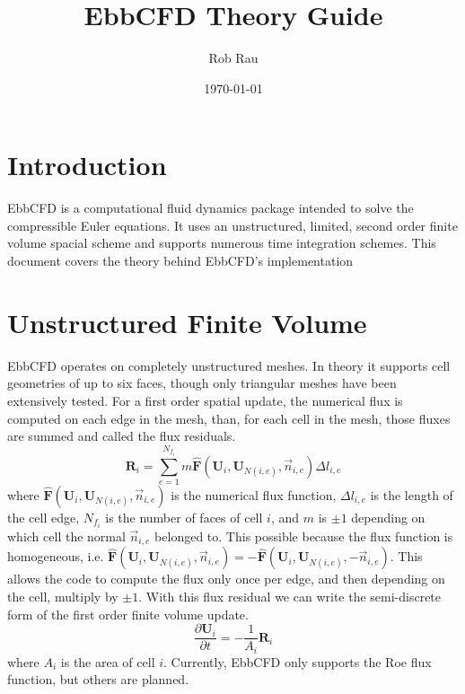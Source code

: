\documentclass[12pt,parskip=full]{article}
\numberwithin{subsection}{section}
\begin{document}
	\vspace{-4ex}
	\title{EbbCFD Theory Guide\vspace{-3.5ex}}
	\author{Rob Rau\vspace{-4ex}}
	\date{\today\vspace{-4ex}}
	\maketitle

	\section{Introduction}
		EbbCFD is a computational fluid dynamics package intended to solve the compressible Euler equations.
		It uses an unstructured, limited, second order finite volume spacial scheme and supports numerous
		time integration schemes. This document covers the theory behind EbbCFD's implementation

	\section{Unstructured Finite Volume}
		EbbCFD operates on completely unstructured meshes. In theory it supports cell geometries of up to six faces,
		though only triangular meshes have been extensively tested. For a first order spatial update, the numerical flux
		is computed on each edge in the mesh, than, for each cell in the mesh, those fluxes are summed and called the
		flux residuals.
		\begin{equation}
			\mathbf{R}_i = \sum_{e = 1}^{N_{f_i}}{m\mathbf{\hat{F}}(\mathbf{U}_i, \mathbf{U}_{N(i,e)}, \vec{n}_{i,e}) \Delta l_{i,e}}
		\end{equation}
		where $\mathbf{\hat{F}}(\mathbf{U}_i, \mathbf{U}_{N(i,e)}, \vec{n}_{i,e})$ is the numerical flux function,
		$\Delta l_{i,e}$ is the length of the cell edge, $N_{f_i}$ is the number of faces of cell $i$, and $m$ is $\pm 1$
		depending on which cell the normal $\vec{n}_{i,e}$ belonged to. This possible because the flux function is homogeneous, i.e.
		$\mathbf{\hat{F}}(\mathbf{U}_i, \mathbf{U}_{N(i,e)}, \vec{n}_{i,e}) = -\mathbf{\hat{F}}(\mathbf{U}_i, \mathbf{U}_{N(i,e)}, -\vec{n}_{i,e})$.
		This allows the code to compute the flux only once per edge, and then depending on the cell, multiply by $\pm 1$.
		With this flux residual we can write the semi-discrete form of the first order finite volume update.
		\begin{equation}
			\frac{\partial \mathbf{U}_i}{\partial t} = -\frac{1}{A_i}\mathbf{R}_i
		\end{equation}
		where $A_i$ is the area of cell $i$. Currently, EbbCFD only supports the Roe flux function, but others are planned.
\end{document}

